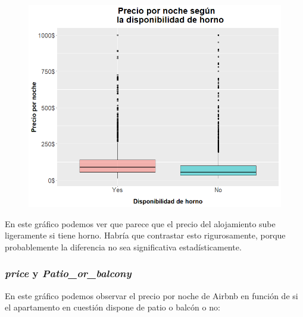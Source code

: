 \documentclass{article}
\begin{document}
\vspace{0.35cm}
\begin{figure}[h]
\hspace*{-0.15cm}
\centering
\includegraphics[scale = 0.6]{boxplot_precio_Oven}
\end{figure}
\vspace{0.15cm}

En este gráfico podemos ver que parece que el precio del alojamiento sube ligeramente si tiene horno. Habría que contrastar esto rigurosamente, porque probablemente la diferencia no sea significativa estadísticamente.

\clearpage
\subsubsection{\emph{price} y \emph{Patio\_or\_balcony}}

En este gráfico podemos observar el precio por noche de Airbnb en función de si el apartamento en cuestión dispone de patio o balcón o no:
\end{document}
